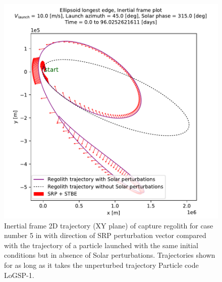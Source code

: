 \begin{figure}[htb]
\centering
\captionsetup{justification=centering}
\includegraphics[width=\textwidth, height=0.5\textheight, keepaspectratio=true]{longest_edge_perturbations/3.2Density_1cmSize/singlePlot_comparative_PerturbationVector_10ms_45Azimuth_315SolarPhase_inertialFrame.pdf}
\caption{Inertial frame 2D trajectory (XY plane) of capture regolith for case number 5 in  with direction of \gls{SRP} perturbation vector compared with the trajectory of a particle launched with the same initial conditions but in absence of Solar perturbations. Trajectories shown for as long as it takes the unperturbed trajectory Particle code LoGSP-1.}
\label{fig:LoGSP_1_capture_case_5_2d_trajectory_comparative_inertialFrame}
\end{figure}
\FloatBarrier

